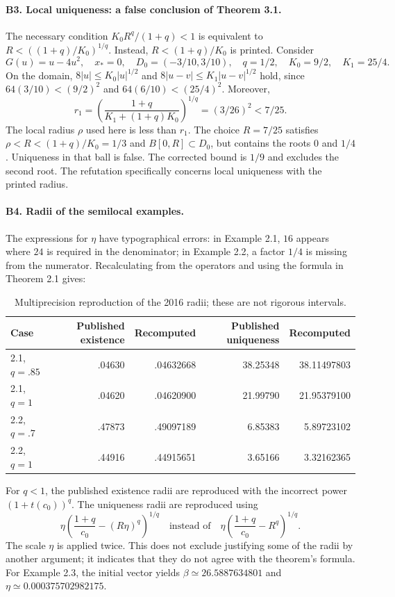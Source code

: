 \documentclass[11pt,a4paper]{article}
\numberwithin{equation}{section}
\numberwithin{table}{section}
\theoremstyle{plain}
\theoremstyle{definition}\newtheorem{definition}[theorem]{Definition}
\theoremstyle{remark}\newtheorem{remark}[theorem]{Remark}
\begin{document}
\paragraph{B3. Local uniqueness: a false conclusion of Theorem 3.1.}
The necessary condition $K_0R^q/(1+q)<1$ is equivalent to
$R<((1+q)/K_0)^{1/q}$. Instead, $R<(1+q)/K_0$ is printed.
Consider
\[
 G(u)=u-4u^2,\quad x_*=0,\quad D_0=(-3/10,3/10),\quad
 q=1/2,\quad K_0=9/2,\quad K_1=25/4.
\]
On the domain, $8|u|\leq K_0|u|^{1/2}$ and
$8|u-v|\leq K_1|u-v|^{1/2}$ hold, since
$64(3/10)<(9/2)^2$ and $64(6/10)<(25/4)^2$.
Moreover,
\[
 r_1=\left(\frac{1+q}{K_1+(1+q)K_0}\right)^{1/q}
 =(3/26)^2<7/25.
\]
The local radius $\rho$ used here is less than $r_1$.
The choice $R=7/25$ satisfies $\rho<R<(1+q)/K_0=1/3$ and
$B[0,R]\subset D_0$, but contains the roots $0$ and $1/4$.
Uniqueness in that ball is false. The corrected bound is $1/9$ and
excludes the second root. The refutation specifically concerns local
uniqueness with the printed radius.

\paragraph{B4. Radii of the semilocal examples.}
The expressions for $\eta$ have typographical errors: in Example 2.1,
$16$ appears where $24$ is required in the denominator; in Example 2.2,
a factor $1/4$ is missing from the numerator. Recalculating from the
operators and using the formula in Theorem 2.1 gives:
\begin{table}[htbp]\centering\small
\begin{tabular}{@{}lrrrr@{}}\toprule
Case & Published existence & Recomputed & Published uniqueness & Recomputed\\\midrule
2.1, $q=.85$ & .04630 & .04632668 & 38.25348 & 38.11497803\\
2.1, $q=1$ & .04620 & .04620900 & 21.99790 & 21.95379100\\
2.2, $q=.7$ & .47873 & .49097189 & 6.85383 & 5.89723102\\
2.2, $q=1$ & .44916 & .44915651 & 3.65166 & 3.32162365\\
\bottomrule\end{tabular}
\caption{Multiprecision reproduction of the 2016 radii; these are not
rigorous intervals.}\label{supp:tab:singh-radii}
\end{table}
For $q<1$, the published existence radii are reproduced with the
incorrect power $(1+t(c_0))^q$. The uniqueness radii are reproduced
using
\[
 \eta\left(\frac{1+q}{c_0}-(R\eta)^q\right)^{1/q}
 \quad\text{instead of}\quad
 \eta\left(\frac{1+q}{c_0}-R^q\right)^{1/q}.
\]
The scale $\eta$ is applied twice. This does not exclude justifying
some of the radii by another argument; it indicates that they do not
agree with the theorem's formula. For Example 2.3, the initial vector
yields $\beta\simeq26.5887634801$ and
$\eta\simeq0.000375702982175$.
\end{document}
